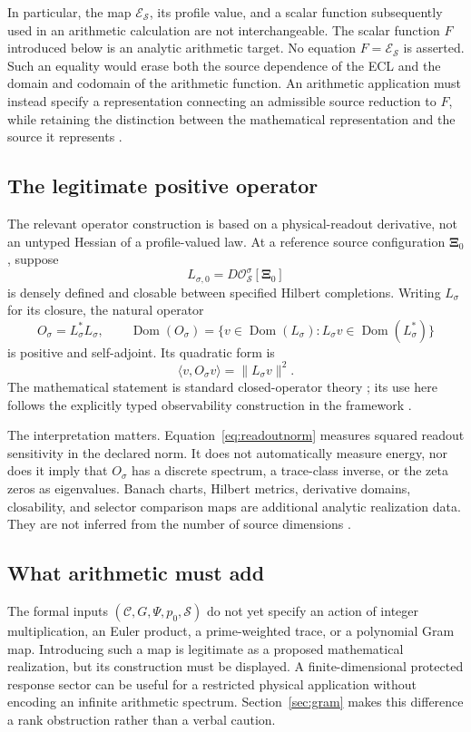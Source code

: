 \documentclass[11pt,letterpaper]{article}
\numberwithin{equation}{section}
\theoremstyle{definition}
\theoremstyle{remark}
\newcommand{\CS}{\mathcal C}
\newcommand{\ES}{\mathcal E_{\mathcal S}}
\newcommand{\src}{\boldsymbol\Xi}
\DeclareMathOperator{\Dom}{Dom}
\begin{document}
In particular, the map $\ES$, its profile value, and a scalar function subsequently used in an arithmetic calculation are not interchangeable. The scalar function $F$ introduced below is an analytic arithmetic target. No equation $F=\ES$ is asserted. Such an equality would erase both the source dependence of the ECL and the domain and codomain of the arithmetic function. An arithmetic application must instead specify a representation connecting an admissible source reduction to $F$, while retaining the distinction between the mathematical representation and the source it represents \cite{tcgsfoundation}.

\subsection{The legitimate positive operator}
The relevant operator construction is based on a physical-readout derivative, not an untyped Hessian of a profile-valued law. At a reference source configuration $\src_0$, suppose
\begin{equation}
 L_{\sigma,0}=D\mathcal O^\sigma_{\mathcal S}[\src_0]
\end{equation}
is densely defined and closable between specified Hilbert completions. Writing $L_\sigma$ for its closure, the natural operator
\begin{equation}
 O_\sigma=L_\sigma^*L_\sigma,\qquad
 \Dom(O_\sigma)=\{v\in\Dom(L_\sigma):L_\sigma v\in\Dom(L_\sigma^*)\}
 \label{eq:observability}
\end{equation}
is positive and self-adjoint. Its quadratic form is
\begin{equation}
 \langle v,O_\sigma v\rangle=\|L_\sigma v\|^2.
 \label{eq:readoutnorm}
\end{equation}
The mathematical statement is standard closed-operator theory \cite{reed}; its use here follows the explicitly typed observability construction in the framework \cite{tcgsoperator}.

The interpretation matters. Equation~\eqref{eq:readoutnorm} measures squared readout sensitivity in the declared norm. It does not automatically measure energy, nor does it imply that $O_\sigma$ has a discrete spectrum, a trace-class inverse, or the zeta zeros as eigenvalues. Banach charts, Hilbert metrics, derivative domains, closability, and selector comparison maps are additional analytic realization data. They are not inferred from the number of source dimensions \cite{tcgsoperator}.

\subsection{What arithmetic must add}
The formal inputs $(\CS,G,\Psi,p_0,\mathcal S)$ do not yet specify an action of integer multiplication, an Euler product, a prime-weighted trace, or a polynomial Gram map. Introducing such a map is legitimate as a proposed mathematical realization, but its construction must be displayed. A finite-dimensional protected response sector can be useful for a restricted physical application without encoding an infinite arithmetic spectrum. Section~\ref{sec:gram} makes this difference a rank obstruction rather than a verbal caution.
\end{document}

